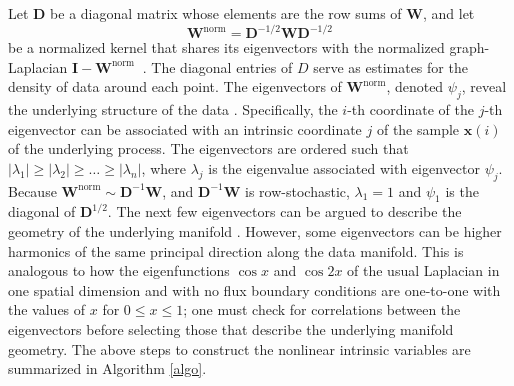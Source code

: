 Let $\mathbf{D}$ be a diagonal matrix whose elements are the row sums of $\mathbf{W}$, and let
\begin{equation}\label{eq:kernel2}
\mathbf{W}^{\mathrm{norm}} = \mathbf{D}^{-1/2}\mathbf{W}\mathbf{D}^{-1/2}
\end{equation}
be a normalized kernel that shares its eigenvectors with the normalized graph-Laplacian $\mathbf{I}-\mathbf{W}^{\mathrm{norm}} \:$ \cite{chung1997spectral}.
%
The diagonal entries of $D$ serve as estimates for the density of data around each point.
%
The eigenvectors of $\mathbf{W}^{\mathrm{norm}}$, denoted $\psi_j$, reveal the underlying structure of the data \cite{coifman2005geometric}.
%
Specifically, the $i$-th coordinate of the $j$-th eigenvector can be associated with an intrinsic coordinate $j$ of the sample $\mathbf{x}(i)$ of the underlying process.
%
The eigenvectors are ordered such that $|\lambda_1| \ge |\lambda_2| \ge \dots \ge |\lambda_n|$, where $\lambda_j$ is the eigenvalue associated with eigenvector $\psi_j$.
%
Because $\mathbf{W}^{\mathrm{norm}} \sim \mathbf{D}^{-1}\mathbf{W} $, and $\mathbf{D}^{-1}\mathbf{W}$ is row-stochastic,
$\lambda_1 = 1$ and $\psi_1$ is the diagonal of $\mathbf{D}^{1/2}$.
%
The next few eigenvectors can be argued to describe the geometry of the underlying manifold \cite{coifman2005geometric}.
%
However, some eigenvectors can be higher harmonics of the same principal direction along the data manifold.
This is analogous to how the eigenfunctions $\cos x$ and $\cos 2x$ of the usual Laplacian in one spatial dimension
and with no flux boundary conditions are one-to-one with the values of $x$ for $0 \le x \le 1$;
one must check for correlations between the eigenvectors before selecting those that describe the underlying manifold geometry.
%
The above steps to construct the nonlinear intrinsic variables are summarized in Algorithm \ref{algo}.

